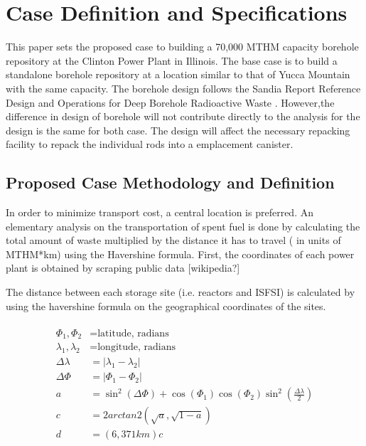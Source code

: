 \section{Case Definition and Specifications}

This paper sets the proposed case to building a 70,000 \gls{MTHM} capacity borehole
 repository at the Clinton Power Plant in Illinois. The base case is to build a
  standalone borehole repository at a location similar to that of Yucca Mountain with
   the same capacity. The borehole design follows the Sandia Report Reference Design
    and Operations for Deep Borehole Radioactive Waste \cite{arnold_reference_2011}.
     However,the difference in design of borehole will not contribute directly
     to the analysis for the design is the same for both case. The design will
     affect the necessary repacking facility to repack the individual rods into
     a emplacement canister.

\subsection{Proposed Case Methodology and Definition}
 In order to minimize transport cost, a central location is preferred. An
  elementary analysis on the transportation of spent fuel is done by
   calculating the total amount of waste multiplied by the distance it has to travel
    ( in units of MTHM*km) using the Havershine formula. First, the coordinates of
    each power plant is obtained by scraping public data [wikipedia?]
 
     The distance between each storage site 
    (i.e. reactors and \gls{ISFSI}) is calculated by 
    using the havershine formula on the geographical coordinates of the sites. 
    \\ \\
 \begin{align} 
         \Phi_1,\Phi_2&= \mbox{latitude, radians}\\
         \lambda_1,\lambda_2 &= \mbox{longitude, radians}\\
         \Delta\lambda &= \left|\lambda_1 - \lambda_2\right|\\
         \Delta\Phi &= \left|\Phi_1 - \Phi_2\right|\\
         a&=\sin^2(\Delta\Phi)+\cos(\Phi_1)\cos(\Phi_2)\sin^2{\left(\frac{\Delta\lambda}{2}\right)}\\
         c &= 2arctan2(\sqrt{a},\sqrt{1-a})\\
         d &=  (6,371km)c
 \end{align}



